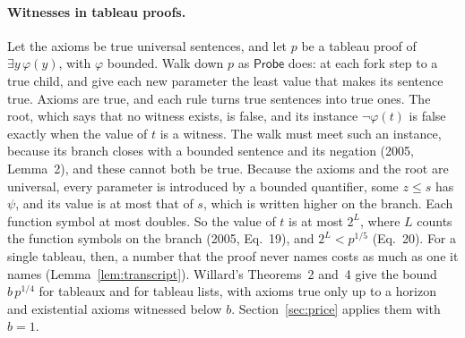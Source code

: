 \documentclass[11pt]{article}
\newcommand{\Prog}[1]{\mathsf{#1}}
\newcommand{\fs}[1]{\ifmmode\text{\guillemotleft#1\guillemotright}\else\guillemotleft#1\guillemotright\fi}
\theoremstyle{plain}
\theoremstyle{definition}
\begin{document}
\paragraph{Witnesses in tableau proofs.} Let the axioms be true universal
sentences, and let $p$ be a tableau proof of $\exists y\,\varphi(y)$, with
$\varphi$ bounded. Walk down $p$ as $\Prog{Probe}$ does: at each fork step to
a true child, and give each new parameter the least value that makes its
sentence true. Axioms are true, and each rule turns true sentences into true
ones. The root, which says that no witness exists, is false, and its instance
$\neg\varphi(t)$ is false exactly when the value of $t$ is a witness. The walk
must meet such an instance, because its branch closes with a bounded sentence
and its negation (2005, Lemma~2), and these cannot both be true. Because the
axioms and the root are universal, every parameter is introduced by a bounded
quantifier, \fs{some $z \le s$ has $\psi$}, and its value is at most that of
$s$, which is written higher on the branch. Each function symbol at most
doubles. So the value of $t$ is at most $2^L$, where $L$ counts the function
symbols on the branch (2005, Eq.~19), and $2^L < p^{1/5}$ (Eq.~20). For a
single tableau, then, a number that the proof never names costs as much as
one it names (Lemma~\ref{lem:transcript}). Willard's Theorems~2 and~4 give the
bound $b\,p^{1/4}$ for tableaux and for tableau lists, with axioms true only
up to a horizon and existential axioms witnessed below $b$. Section~\ref{sec:price}
applies them with $b = 1$.
\end{document}
